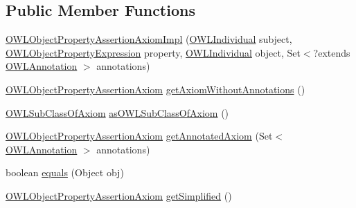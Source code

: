 \subsection*{Public Member Functions}
\begin{DoxyCompactItemize}
\item 
\hyperlink{classuk_1_1ac_1_1manchester_1_1cs_1_1owl_1_1owlapi_1_1_o_w_l_object_property_assertion_axiom_impl_a4c0fb88b60ecf2643de60b24e870a06a}{O\-W\-L\-Object\-Property\-Assertion\-Axiom\-Impl} (\hyperlink{interfaceorg_1_1semanticweb_1_1owlapi_1_1model_1_1_o_w_l_individual}{O\-W\-L\-Individual} subject, \hyperlink{interfaceorg_1_1semanticweb_1_1owlapi_1_1model_1_1_o_w_l_object_property_expression}{O\-W\-L\-Object\-Property\-Expression} property, \hyperlink{interfaceorg_1_1semanticweb_1_1owlapi_1_1model_1_1_o_w_l_individual}{O\-W\-L\-Individual} object, Set$<$?extends \hyperlink{interfaceorg_1_1semanticweb_1_1owlapi_1_1model_1_1_o_w_l_annotation}{O\-W\-L\-Annotation} $>$ annotations)
\item 
\hyperlink{interfaceorg_1_1semanticweb_1_1owlapi_1_1model_1_1_o_w_l_object_property_assertion_axiom}{O\-W\-L\-Object\-Property\-Assertion\-Axiom} \hyperlink{classuk_1_1ac_1_1manchester_1_1cs_1_1owl_1_1owlapi_1_1_o_w_l_object_property_assertion_axiom_impl_accd39562038e1927ec6620878f5b877a}{get\-Axiom\-Without\-Annotations} ()
\item 
\hyperlink{interfaceorg_1_1semanticweb_1_1owlapi_1_1model_1_1_o_w_l_sub_class_of_axiom}{O\-W\-L\-Sub\-Class\-Of\-Axiom} \hyperlink{classuk_1_1ac_1_1manchester_1_1cs_1_1owl_1_1owlapi_1_1_o_w_l_object_property_assertion_axiom_impl_a615c97d41ae72fed21ff28328bd1b032}{as\-O\-W\-L\-Sub\-Class\-Of\-Axiom} ()
\item 
\hyperlink{interfaceorg_1_1semanticweb_1_1owlapi_1_1model_1_1_o_w_l_object_property_assertion_axiom}{O\-W\-L\-Object\-Property\-Assertion\-Axiom} \hyperlink{classuk_1_1ac_1_1manchester_1_1cs_1_1owl_1_1owlapi_1_1_o_w_l_object_property_assertion_axiom_impl_aafece545b54e6e79990eaf759d665ae9}{get\-Annotated\-Axiom} (Set$<$ \hyperlink{interfaceorg_1_1semanticweb_1_1owlapi_1_1model_1_1_o_w_l_annotation}{O\-W\-L\-Annotation} $>$ annotations)
\item 
boolean \hyperlink{classuk_1_1ac_1_1manchester_1_1cs_1_1owl_1_1owlapi_1_1_o_w_l_object_property_assertion_axiom_impl_a23ac40725a528603d75092c87d72317c}{equals} (Object obj)
\item 
\hyperlink{interfaceorg_1_1semanticweb_1_1owlapi_1_1model_1_1_o_w_l_object_property_assertion_axiom}{O\-W\-L\-Object\-Property\-Assertion\-Axiom} \hyperlink{classuk_1_1ac_1_1manchester_1_1cs_1_1owl_1_1owlapi_1_1_o_w_l_object_property_assertion_axiom_impl_a37f5d6eb850dd408386e2baeb7a0f08c}{get\-Simplified} ()

\end{DoxyCompactItemize}
